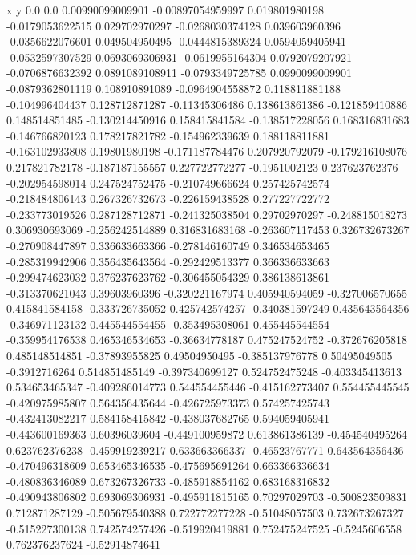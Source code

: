               x                y
            0.0              0.0
0.00990099009901  -0.00897054959997
 0.019801980198  -0.0179053622515
 0.029702970297  -0.0268030374128
 0.039603960396  -0.0356622076601
 0.049504950495  -0.0444815389324
0.0594059405941  -0.0532597307529
0.0693069306931  -0.0619955164304
0.0792079207921  -0.0706876632392
0.0891089108911  -0.0793349725785
0.0990099009901  -0.0879362801119
 0.108910891089  -0.0964904558872
 0.118811881188  -0.104996404437
 0.128712871287   -0.11345306486
 0.138613861386  -0.121859410886
 0.148514851485  -0.130214450916
 0.158415841584  -0.138517228056
 0.168316831683  -0.146766820123
 0.178217821782  -0.154962339639
 0.188118811881  -0.163102933808
  0.19801980198  -0.171187784476
 0.207920792079  -0.179216108076
 0.217821782178  -0.187187155557
 0.227722772277    -0.1951002123
 0.237623762376  -0.202954598014
 0.247524752475  -0.210749666624
 0.257425742574  -0.218484806143
 0.267326732673  -0.226159438528
 0.277227722772  -0.233773019526
 0.287128712871  -0.241325038504
  0.29702970297  -0.248815018273
 0.306930693069  -0.256242514889
 0.316831683168  -0.263607117453
 0.326732673267  -0.270908447897
 0.336633663366  -0.278146160749
 0.346534653465  -0.285319942906
 0.356435643564  -0.292429513377
 0.366336633663  -0.299474623032
 0.376237623762  -0.306455054329
 0.386138613861  -0.313370621043
  0.39603960396  -0.320221167974
 0.405940594059  -0.327006570655
 0.415841584158  -0.333726735052
 0.425742574257  -0.340381597249
 0.435643564356  -0.346971123132
 0.445544554455  -0.353495308061
 0.455445544554  -0.359954176538
 0.465346534653   -0.36634778187
 0.475247524752  -0.372676205818
 0.485148514851   -0.37893955825
  0.49504950495  -0.385137976778
  0.50495049505    -0.3912716264
 0.514851485149  -0.397340699127
 0.524752475248  -0.403345413613
 0.534653465347  -0.409286014773
 0.544554455446  -0.415162773407
 0.554455445545  -0.420975985807
 0.564356435644  -0.426725973373
 0.574257425743  -0.432413082217
 0.584158415842  -0.438037682765
 0.594059405941  -0.443600169363
  0.60396039604  -0.449100959872
 0.613861386139  -0.454540495264
 0.623762376238  -0.459919239217
 0.633663366337   -0.46523767771
 0.643564356436  -0.470496318609
 0.653465346535  -0.475695691264
 0.663366336634  -0.480836346089
 0.673267326733  -0.485918854162
 0.683168316832  -0.490943806802
 0.693069306931  -0.495911815165
  0.70297029703  -0.500823509831
 0.712871287129  -0.505679540388
 0.722772277228   -0.51048057503
 0.732673267327  -0.515227300138
 0.742574257426  -0.519920419881
 0.752475247525    -0.5245606558
 0.762376237624   -0.52914874641
